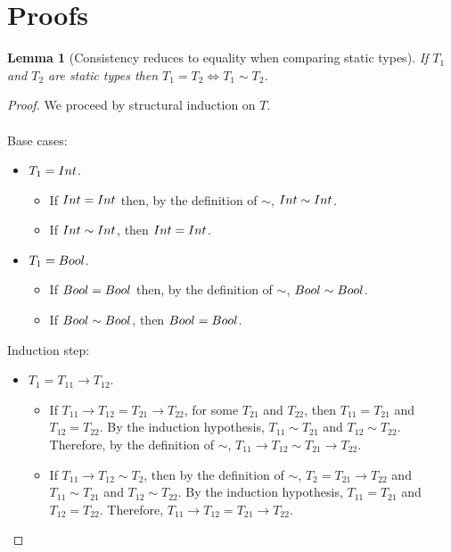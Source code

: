 \documentclass[a4paper]{article}
\newtheorem{lemma}{Lemma}
\begin{document}
\newpage

\section{Proofs}
\begin{lemma}[Consistency reduces to equality when comparing static types]
\label{consistencytoequality}
If $T_1$ and $T_2$ are static types then $T_1 = T_2 \iff T_1 \sim T_2$.
\end{lemma}
\begin{proof}
We proceed by structural induction on $T$.\\\\
Base cases:
\begin{itemize}
    \item $T_1 = {Int}$.
    \begin{itemize}
        \item If ${Int} = {Int}$ then, by the definition of $\sim$, ${Int} \sim {\ensuremath{Int}}$.
        \item If ${Int} \sim {\ensuremath{Int}}$, then ${Int} = {Int}$.
    \end{itemize}
    \item $T_1 = Bool$.
    \begin{itemize}
        \item If $Bool = Bool$ then, by the definition of $\sim$, $Bool \sim Bool$.
        \item If $Bool \sim Bool$, then $Bool = Bool$.
    \end{itemize}
\end{itemize}
Induction step:
\begin{itemize}
    \item $T_1 = T_{11} \rightarrow T_{12}$.
    \begin{itemize}
        \item If $T_{11} \rightarrow T_{12} = T_{21} \rightarrow T_{22}$, for some $T_{21}$ and $T_{22}$, then $T_{11} = T_{21}$ and $T_{12} = T_{22}$.
        By the induction hypothesis, $T_{11} \sim T_{21}$ and $T_{12} \sim T_{22}$.
        Therefore, by the definition of $\sim$, $T_{11} \rightarrow T_{12} \sim T_{21} \rightarrow T_{22}$.
        \item If $T_{11} \rightarrow T_{12} \sim T_2$, then by the definition of $\sim$, $T_2 = T_{21} \rightarrow T_{22}$ and $T_{11} \sim T_{21}$ and $T_{12} \sim T_{22}$.
        By the induction hypothesis, $T_{11} = T_{21}$ and $T_{12} = T_{22}$.
        Therefore, $T_{11} \rightarrow T_{12} = T_{21} \rightarrow T_{22}$.
    \end{itemize}

\end{itemize}
\end{proof}
\end{document}
